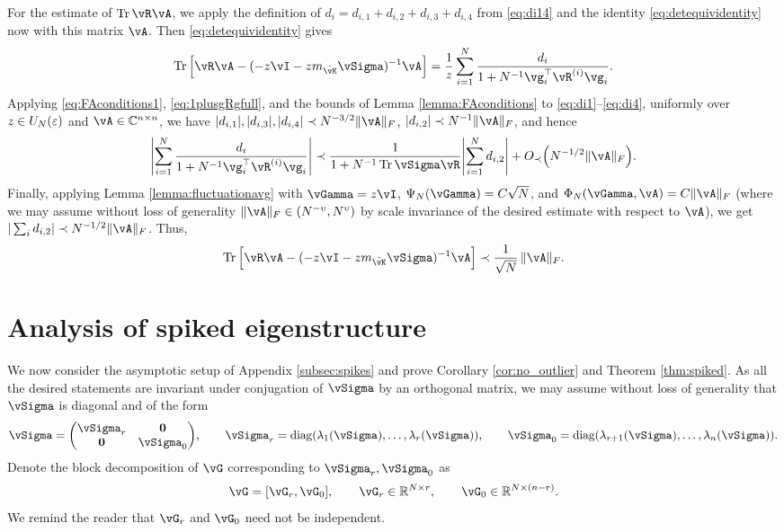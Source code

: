\begin{proof-of-theorem}[\ref{thm:deterministic_equ}]
For the estimate of $\Tr \vR\vA$, we apply the definition of
$d_i=d_{i,1}+d_{i,2}+d_{i,3}+d_{i,4}$ from \eqref{eq:di14}
and the identity \eqref{eq:detequividentity} now with this matrix $\vA$. Then
\eqref{eq:detequividentity} gives
\[\Tr \Big[\vR\vA-({-}z\vI-zm_{\tilde \vK}\vSigma)^{-1}\vA\Big]
=\frac{1}{z}\sum_{i=1}^N \frac{d_i}{1+N^{-1}\vg_i^\top \vR^{(i)}\vg_i}.\]
Applying \eqref{eq:FAconditions1}, \eqref{eq:1plusgRgfull},
and the bounds of Lemma \ref{lemma:FAconditions} to
\eqref{eq:di1}--\eqref{eq:di4}, uniformly over $z \in U_N(\varepsilon)$ and $\vA \in
\C^{n \times n}$, we have $|d_{i,1}|,|d_{i,3}|,|d_{i,4}|
\prec N^{-3/2}\|\vA\|_F$, $|d_{i,2}| \prec N^{-1}\|\vA\|_F$, and hence
\[\left|\sum_{i=1}^N \frac{d_i}{1+N^{-1}\vg_i^\top \vR^{(i)}\vg_i}\right|
\prec \frac{1}{1+N^{-1}\Tr \vSigma\vR}\left|\sum_{i=1}^N d_{i,2}\right|
+\SD{N^{-1/2}\|\vA\|_F}.\]
Finally, applying Lemma \ref{lemma:fluctuationavg} with $\vGamma=z\vI$,
$\Psi_N(\vGamma)=C\sqrt{N}$, and $\Phi_N(\vGamma,\vA)=C\|\vA\|_F$ (where we may
assume without loss of generality $\|\vA\|_F \in (N^{-\upsilon},N^\upsilon)$
by scale invariance of the desired estimate with respect to $\vA$),
we get $|\sum_i d_{i,2}| \prec N^{-1/2}\|\vA\|_F$. Thus,
\[\Tr \Big[\vR\vA-({-}z\vI-zm_{\tilde \vK}\vSigma)^{-1}\vA\Big]
\prec \frac{1}{\sqrt{N}}\,\|\vA\|_F.\]
\end{proof-of-theorem}


\section{Analysis of spiked eigenstructure}\label{appendix:spike}

We now consider the asymptotic setup of Appendix \ref{subsec:spikes} and
prove Corollary \ref{cor:no_outlier} and Theorem \ref{thm:spiked}.
As all the desired
statements are invariant under conjugation of $\vSigma$ by an orthogonal matrix,
we may assume without loss of generality that $\vSigma$ is diagonal and of the
form
\[\vSigma=\begin{pmatrix}
	\vSigma_r & \mathbf{0}\\
	\mathbf{0} & \vSigma_0
\end{pmatrix}, \qquad
\vSigma_r=\diag(\lambda_1(\vSigma),\ldots,\lambda_r(\vSigma)),
\qquad \vSigma_0=\diag(\lambda_{r+1}(\vSigma),\ldots,\lambda_n(\vSigma)).\]
Denote the block decomposition of $\vG$ corresponding to
$\vSigma_r,\vSigma_0$ as
\[\vG=[\vG_r,\vG_0], \qquad \vG_r \in \R^{N \times r},\qquad
\vG_0 \in \R^{N \times (n-r)}.\]
We remind the reader that $\vG_r$ and $\vG_0$ need not be independent.

